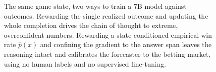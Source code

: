 \begin{figure}[t]
{\begin{tikzpicture}
\end{tikzpicture}%
}
\caption{The same game state, two ways to train a 7B model against outcomes. Rewarding the single
realized outcome and updating the whole completion drives the chain of thought to extreme, overconfident
numbers. Rewarding a state-conditioned empirical win rate $\hat p(x)$ and confining the gradient to the
answer span leaves the reasoning intact and calibrates the forecaster to the betting market, using no
human labels and no supervised fine-tuning.}
\label{fig:principle}
\end{figure}
